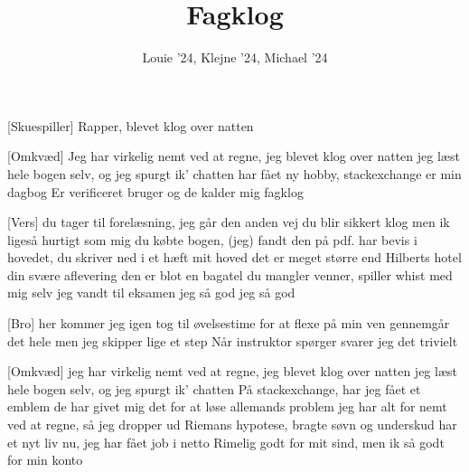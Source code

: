 \documentclass[a4paper,11pt]{article}
\title{Fagklog}
\author{Louie '24, Klejne '24, Michael '24}
\begin{document}
\maketitle

\begin{roles}
[Skuespiller] Rapper, blevet klog over natten
\end{roles}

\begin{song}
[Omkvæd] 
  Jeg har virkelig nemt ved at regne, jeg blevet klog over natten
  jeg læst hele bogen selv, og jeg spurgt ik' chatten
  har fået ny hobby, stackexchange er min dagbog
  Er verificeret bruger og de kalder mig fagklog

  [Vers] du tager til forelæsning, jeg går den anden vej
  du blir sikkert klog men ik ligeså hurtigt som mig
  du købte bogen, (jeg) fandt den på pdf.
  har bevis i hovedet, du skriver ned i et hæft
  mit hoved det er meget større end Hilberts hotel
  din svære aflevering den er blot en bagatel
  du mangler venner, spiller whist med mig selv
  jeg vandt til eksamen jeg så god jeg så god

  [Bro] her kommer jeg igen
  tog til øvelsestime for at flexe på min ven
  gennemgår det hele men jeg skipper lige et step
  Når instruktor spørger svarer jeg det trivielt

  [Omkvæd] 
  jeg har virkelig nemt ved at regne, jeg blevet klog over natten
  jeg læst hele bogen selv, og jeg spurgt ik' chatten
  På stackexchange, har jeg fået et emblem
  de har givet mig det for at løse allemands problem
  jeg har alt for nemt ved at regne, så jeg dropper ud
  Riemans hypotese, bragte søvn og underskud
  har et nyt liv nu, jeg har fået job i netto
  Rimelig godt for mit sind, men ik så godt for min konto
\end{song}
\end{document}
